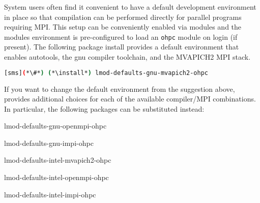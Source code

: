 System users often find it convenient to have a default development environment
in place so that compilation can be performed directly for parallel programs
requiring MPI. This setup can be conveniently enabled via modules and the \OHPC{}
modules environment is pre-configured to load an \texttt{ohpc} module on login
(if present).  The following package install provides a default
environment that enables autotools, the gnu compiler toolchain, and the
MVAPICH2 MPI stack.

\begin{lstlisting}[language=bash]
[sms](*\#*) (*\install*) lmod-defaults-gnu-mvapich2-ohpc
\end{lstlisting}

\begin{center}
\begin{tcolorbox}[]
\small
If you want to change the default environment from the suggestion above, \OHPC{}
provides additional choices for each of the available compiler/MPI
combinations. In particular, the following packages can be substituted instead:
\begin{multicols}{2}
\begin{itemize*}
\item lmod-defaults-gnu-openmpi-ohpc
\item lmod-defaults-gnu-impi-ohpc
\item lmod-defaults-intel-mvapich2-ohpc
\item lmod-defaults-intel-openmpi-ohpc
\item lmod-defaults-intel-impi-ohpc
\end{itemize*}
\end{multicols}
\end{tcolorbox}
\end{center}
